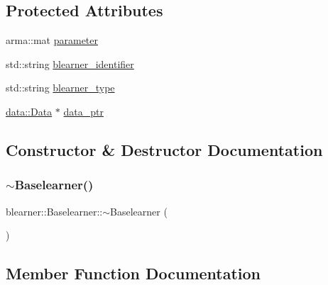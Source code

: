 \subsection*{Protected Attributes}
\begin{DoxyCompactItemize}
\item 
arma\+::mat \mbox{\hyperlink{classblearner_1_1_baselearner_a56e401f574b274d65e364493277f3247}{parameter}}
\item 
std\+::string \mbox{\hyperlink{classblearner_1_1_baselearner_a7112e057b2b29bb6529df6df3b8a9165}{blearner\+\_\+identifier}}
\item 
std\+::string \mbox{\hyperlink{classblearner_1_1_baselearner_aed6406144af33850b3cb9222dddf3f57}{blearner\+\_\+type}}
\item 
\mbox{\hyperlink{classdata_1_1_data}{data\+::\+Data}} $\ast$ \mbox{\hyperlink{classblearner_1_1_baselearner_a5b5cfab411ff94a13bcce4ca0dd4e507}{data\+\_\+ptr}}
\end{DoxyCompactItemize}


\subsection{Constructor \& Destructor Documentation}
\mbox{\label{classblearner_1_1_baselearner_a1ada1c47d71e60bec80ab033ffa40813}} 
\subsubsection{\texorpdfstring{$\sim$\+Baselearner()}{~Baselearner()}}
{\footnotesize\ttfamily blearner\+::\+Baselearner\+::$\sim$\+Baselearner (\begin{DoxyParamCaption}{ }\end{DoxyParamCaption})\hspace{0.3cm}{\ttfamily [virtual]}}



\subsection{Member Function Documentation}
\mbox{\label{classblearner_1_1_baselearner_a8e12c6739f085917a7d2da6570c51a21}} 
